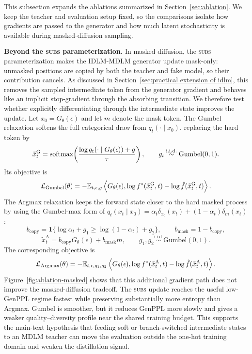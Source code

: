 This subsection expands the ablations summarized in
Section~\ref{sec:ablation}. We keep the teacher and evaluation setup fixed, so
the comparisons isolate how gradients are passed to the generator and how much
latent stochasticity is available during masked-diffusion sampling.

\noindent\textbf{Beyond the \textsc{subs} parameterization.}
In masked diffusion, the \textsc{subs} parameterization makes the IDLM-MDLM
generator update mask-only: unmasked positions are copied by both the teacher
and fake model, so their contribution cancels. As discussed in
Section~\ref{sec:practical extension of idlm}, this removes the sampled
intermediate token from the generator gradient and behaves like an implicit
stop-gradient through the absorbing transition. We therefore test whether
explicitly differentiating through the intermediate state improves the update.
Let $x_0=G_\theta(\epsilon)$ and let $m$ denote the mask token. The Gumbel
relaxation softens the full categorical draw from $q_t(\cdot\mid x_0)$,
replacing the hard token by
\[
\tilde{x}^{\mathrm{G}}_t
=
\mathrm{softmax}\!\left(
\frac{\log q_t(\cdot\mid G_\theta(\epsilon)) + g}{\tau}
\right),
\qquad
g_i \overset{\mathrm{i.i.d.}}{\sim}\mathrm{Gumbel}(0,1).
\]
Its objective is
\[
\mathcal{L}_{\mathrm{Gumbel}}(\theta)
=
-\mathbb{E}_{t,\epsilon,g}
\left\langle
G_\theta(\epsilon),
\log f^*(\tilde{x}^{\mathrm{G}}_t,t)
-
\log \hat f(\tilde{x}^{\mathrm{G}}_t,t)
\right\rangle .
\]
The Argmax relaxation keeps the forward state closer to the hard masked
process by using the Gumbel-max form of
$q_t(x_t\mid x_0)=\alpha_t\delta_{x_0}(x_t)+(1-\alpha_t)\delta_m(x_t)$:
\[
b_{\mathrm{copy}}
=
\mathbf{1}\{\log \alpha_t + g_1
\geq
\log(1-\alpha_t)+g_2\},
\qquad
b_{\mathrm{mask}}=1-b_{\mathrm{copy}},
\]
\[
\tilde{x}^{\mathrm{A}}_t
=
b_{\mathrm{copy}}G_\theta(\epsilon)
+
b_{\mathrm{mask}}m,
\qquad
g_1,g_2 \overset{\mathrm{i.i.d.}}{\sim}\mathrm{Gumbel}(0,1).
\]
The corresponding objective is
\[
\mathcal{L}_{\mathrm{Argmax}}(\theta)
=
-\mathbb{E}_{t,\epsilon,g_1,g_2}
\left\langle
G_\theta(\epsilon),
\log f^*(\tilde{x}^{\mathrm{A}}_t,t)
-
\log \hat f(\tilde{x}^{\mathrm{A}}_t,t)
\right\rangle .
\]
Figure~\ref{fig:ablation-masked} shows that this additional gradient path does
not improve the masked-diffusion tradeoff. The \textsc{subs} update reaches the
useful low-GenPPL regime fastest while preserving substantially more entropy
than Argmax. Gumbel is smoother, but it reduces GenPPL more slowly and gives a
weaker quality--diversity profile near the shared training budget. This
supports the main-text hypothesis that feeding soft or branch-switched
intermediate states to an MDLM teacher can move the evaluation outside the
one-hot training domain and weaken the distillation signal.

